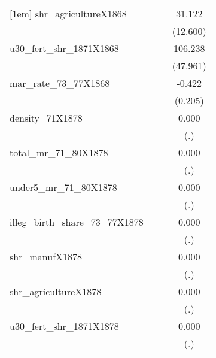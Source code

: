{\begin{tabular}{l*{3}{c}}
[1em]
shr\_agricultureX1868&                     &                     &      31.122\sym{**} \\
                    &                     &                     &    (12.600)         \\
[1em]
u30\_fert\_shr\_1871X1868&                     &                     &     106.238\sym{**} \\
                    &                     &                     &    (47.961)         \\
[1em]
mar\_rate\_73\_77X1868 &                     &                     &      -0.422\sym{**} \\
                    &                     &                     &     (0.205)         \\
[1em]
density\_71X1878     &                     &                     &       0.000         \\
                    &                     &                     &         (.)         \\
[1em]
total\_mr\_71\_80X1878 &                     &                     &       0.000         \\
                    &                     &                     &         (.)         \\
[1em]
under5\_mr\_71\_80X1878&                     &                     &       0.000         \\
                    &                     &                     &         (.)         \\
[1em]
illeg\_birth\_share\_73\_77X1878&                     &                     &       0.000         \\
                    &                     &                     &         (.)         \\
[1em]
shr\_manufX1878      &                     &                     &       0.000         \\
                    &                     &                     &         (.)         \\
[1em]
shr\_agricultureX1878&                     &                     &       0.000         \\
                    &                     &                     &         (.)         \\
[1em]
u30\_fert\_shr\_1871X1878&                     &                     &       0.000         \\
                    &                     &                     &         (.)         \\

\end{tabular}}
